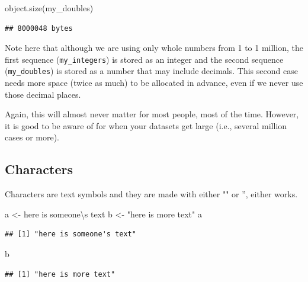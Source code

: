 \documentclass[
]{book}
\newenvironment{Shaded}{\begin{snugshade}}{\end{snugshade}}
\newcommand{\FunctionTok}[1]{\textcolor[rgb]{0.00,0.00,0.00}{#1}}
\newcommand{\NormalTok}[1]{#1}
\newcommand{\OtherTok}[1]{\textcolor[rgb]{0.56,0.35,0.01}{#1}}
\newcommand{\SpecialCharTok}[1]{\textcolor[rgb]{0.00,0.00,0.00}{#1}}
\newcommand{\StringTok}[1]{\textcolor[rgb]{0.31,0.60,0.02}{#1}}
\begin{document}
\begin{Shaded}
\begin{Highlighting}[]
\FunctionTok{object.size}\NormalTok{(my\_doubles)}
\end{Highlighting}
\end{Shaded}

\begin{verbatim}
## 8000048 bytes
\end{verbatim}

Note here that although we are using only whole numbers from 1 to 1 million, the first sequence (\texttt{my\_integers}) is stored as an integer and the second sequence (\texttt{my\_doubles}) is stored as a number that may include decimals. This second case needs more space (twice as much) to be allocated in advance, even if we never use those decimal places.

Again, this will almost never matter for most people, most of the time. However, it is good to be aware of for when your datasets get large (i.e., several million cases or more).

\hypertarget{characters}{%
\subsection{Characters}\label{characters}}

Characters are text symbols and they are made with either "" or '', either works.

\begin{Shaded}
\begin{Highlighting}[]
\NormalTok{a }\OtherTok{\textless{}{-}} \StringTok{\textquotesingle{}here is someone}\SpecialCharTok{\textbackslash{}\textquotesingle{}}\StringTok{s text\textquotesingle{}}
\NormalTok{b }\OtherTok{\textless{}{-}} \StringTok{"here is more text"}
\NormalTok{a}
\end{Highlighting}
\end{Shaded}

\begin{verbatim}
## [1] "here is someone's text"
\end{verbatim}

\begin{Shaded}
\begin{Highlighting}[]
\NormalTok{b}
\end{Highlighting}
\end{Shaded}

\begin{verbatim}
## [1] "here is more text"
\end{verbatim}
\end{document}
